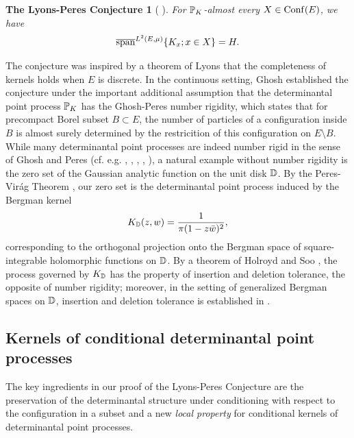 \documentclass[12pt]{paper}
\newtheorem*{conjecture}{The Lyons-Peres Conjecture}
\numberwithin{theorem}{section}
\numberwithin{figure}{section}
\numberwithin{equation}{section}
\begin{document}
\begin{conjecture}[ {\cite[Conjecture 4.6]{Lyons-ICM}}]
For $\mathbb{P}_K$-almost every $X \in \mathrm{Conf}(E)$, we have
\begin{align}\label{lyons-equality}
\overline{\mathrm{span}}^{L^2(E, \mu)}  \{K_x; x\in X \}=H.
\end{align}
\end{conjecture}



The conjecture was inspired by a theorem of  Lyons \cite[Theorem 7.11]{DPP-L}  that the completeness of kernels holds when $E$ is  discrete. In the continuous setting,  Ghosh \cite{Ghosh-sine}  established the conjecture  under the important additional assumption that the  determinantal point process $\mathbb{P}_K$ has the Ghosh-Peres  number rigidity, which states that for precompact Borel subset $B\subset E$, the number of particles of a configuration inside $B$ is almost surely determined by the restricition of this configuration on $E\setminus B$.
While many determinantal point processes are indeed number rigid in the sense of Ghosh and Peres (cf. e.g. \cite{Ghosh-sine}, \cite{Ghosh-rigid},  \cite{Buf-rigid}, \cite{BDQ-ETDS}, \cite{BQ-CMP}),
a natural example  without  number rigidity is the zero set of the Gaussian analytic function on the unit disk $\mathbb{D}$. By the  Peres-Vir{\'a}g Theorem \cite{PV-acta}, our zero set is
the determinantal point process  induced by the Bergman kernel
\[
K_{\mathbb{D}} (z, w) = \frac{1}{\pi (1 - z \bar{w})^2},
\]
 corresponding to the orthogonal projection  onto the Bergman space  of square-integrable holomorphic functions on $\mathbb{D}$. By a theorem of Holroyd and Soo \cite{Soo}, the process governed by $K_{\mathbb{D}}$ has the property of insertion and deletion tolerance,  the opposite of number rigidity;  moreover, in the setting of generalized Bergman spaces on $\mathbb{D}$,  insertion and deletion tolerance is established in \cite{BQ-CMP}.






\subsection{Kernels of conditional  determinantal point processes}

The key ingredients in our proof of the Lyons-Peres Conjecture are the preservation of the determinantal structure under conditioning with respect to the configuration in a subset  and  a new {\it local property}
for conditional kernels of determinantal point processes. 
\end{document}
